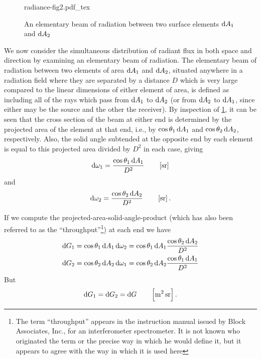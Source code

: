 \begin{refsection}
\begin{figure}
	\begin{center}
		{radiance-fig2.pdf_tex}
	\end{center}
	\caption{An elementary beam of radiation between two surface elements $\mathop{}\!\mathrm{d} A_1$ and $\mathop{}\!\mathrm{d} A_2$}
	\label{fig:nicodemus2}
\end{figure}

We now consider the simultaneous distribution of radiant flux in both space
and direction by examining an elementary beam of radiation. The elementary beam
of radiation between two elements of area $\mathop{}\!\mathrm{d} A_1$ and $\mathop{}\!\mathrm{d} A_2$, situated anywhere in
a radiation field where they are separated by a distance $D$ which is very large
compared to the linear dimensions of either element of area, is defined as
including
all of the rays which pass from $\mathop{}\!\mathrm{d} A_1$ to $\mathop{}\!\mathrm{d} A_2$ (or from $\mathop{}\!\mathrm{d} A_2$ to $\mathop{}\!\mathrm{d} A_1$, since either
may be the source and the other the receiver).
By inspection of \cref{fig:nicodemus2}, it can be seen that the cross
section of
the beam at either end is determined by the projected area of the element at
that end,
i.e., by $\cos\theta_1 \mathop{}\!\mathrm{d} A_1$ and $\cos\theta_2 \mathop{}\!\mathrm{d} A_2$, respectively. Also, the
solid angle
subtended at the opposite end by each element is equal to this projected area
divided by
$D^2$ in each case, giving
\begin{equation*}
\d \omega_1 = \frac{\cos\theta_1 \d A_1}{D^2}
\qquad \left[\unit{\steradian}\right]
\end{equation*}
and
\begin{equation}
\d \omega_2 = \frac{\cos\theta_2 \d A_2}{D^2}
\qquad \left[\unit{\steradian}\right].
\end{equation}

If we compute the projected-area-solid-angle-product (which has also been
referred
to as the ``throughput''\footnote{\label{note:nicodemus7} The term
``throughput'' appears
in the instruction manual issued by Block Associates, Inc., for an
interferometer
spectrometer. It is not known who originated the term or the precise way in
which
he would define it, but it appears to agree with the way in which it is used
here})
at each end we have
\begin{align*}
\d G_1 &= \cos\theta_1 \d A_1 \d \omega_2 = \cos\theta_1 \d A_1 \frac{\cos\theta_2
\d A_2}{D^2} \\
\d G_2 &= \cos\theta_2 \d A_2 \d \omega_1 = \cos\theta_2 \d A_2 \frac{\cos\theta_1
\d A_1}{D^2}
\end{align*}
But
\begin{equation}
\d G_1 = \d G_2 = \d G
\qquad \left[\unit{\square\meter\steradian}\right].
\end{equation}


\end{refsection}
